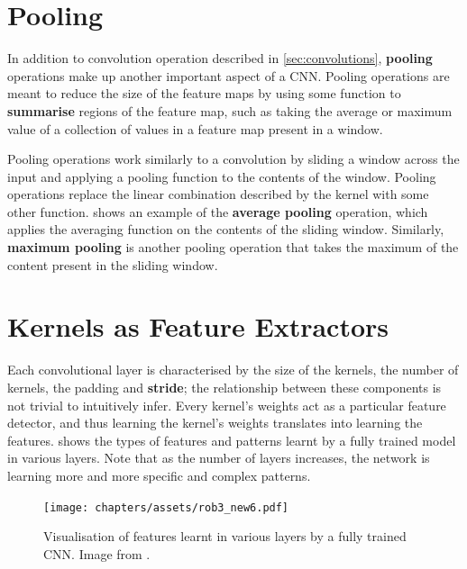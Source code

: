 \section{Pooling}\label{sec:conv-pooling}

In addition to convolution operation described in \cref{sec:convolutions}, \textbf{pooling} operations make up another important aspect of a CNN. Pooling operations are meant to reduce the size of the feature maps by using some function to \textbf{summarise} regions of the feature map, such as taking the average or maximum value of a collection of values in a feature map present in a window.

Pooling operations work similarly to a convolution by sliding a window across the input and applying a pooling function to the contents of the window. 
Pooling operations replace the linear combination described by the kernel with some other function.  shows an example of the \textbf{average pooling} operation, which applies the averaging function on the contents of the sliding window. Similarly, \textbf{maximum pooling} is another pooling operation that takes the maximum of the content present in the sliding window.


\newpage
\section{Kernels as Feature Extractors}\label{sec:kernel-feature-extractor}
Each convolutional layer is characterised by the size of the kernels, the number of kernels, the padding and \textbf{stride}; the relationship between these components is not trivial to intuitively infer. Every kernel's weights act as a particular feature detector, and thus learning the kernel's weights translates into learning the features.  shows the types of features and patterns learnt by a fully trained model in various layers. Note that as the number of layers increases, the network is learning more and more specific and complex patterns.

\begin{figure}[ht]
    \centering
    \captionsetup{justification=RaggedRight}
    \texttt{[image: chapters/assets/rob3\_new6.pdf]}
    \caption{Visualisation of features learnt in various layers by a fully trained CNN. Image from \textcite{Zeiler2013}.}
    \label{fig:feature-viz}
\end{figure}